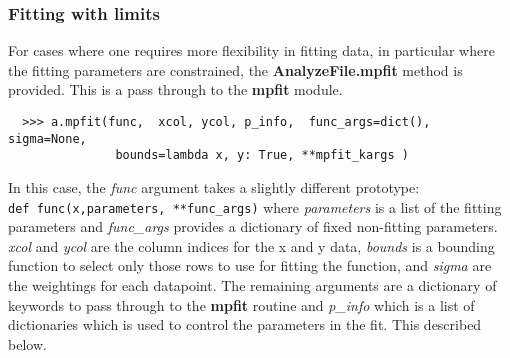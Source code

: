\documentclass[a4paper,11pt]{scrartcl}
\begin{document}
\subsubsection{Fitting with limits}

For cases where one requires more flexibility in fitting data, in particular
where the fitting parameters are constrained, the \textbf{AnalyzeFile.mpfit}
method is provided. This is a pass through to the \textbf{mpfit} module.

\begin{verbatim}
  >>> a.mpfit(func,  xcol, ycol, p_info,  func_args=dict(), sigma=None,
               bounds=lambda x, y: True, **mpfit_kargs )
\end{verbatim}

In this case, the \textit{func} argument takes a slightly different
prototype:\\\verb:def func(x,parameters, **func_args): where \textit{parameters}
is a list of the fitting parameters and \textit{func\_args} provides a
dictionary of fixed \ie non-fitting parameters. \textit{xcol} and \textit{ycol}
are the column indices for the x and y data, \textit{bounds} is a bounding
function to select only those rows to use for fitting the function, and
\textit{sigma} are the weightings for each datapoint. The remaining arguments
are a dictionary of keywords to pass through to the \textbf{mpfit} routine and
\textit{p\_info} which is a list of dictionaries which is used to control the
parameters in the fit. This described below.
\end{document}
